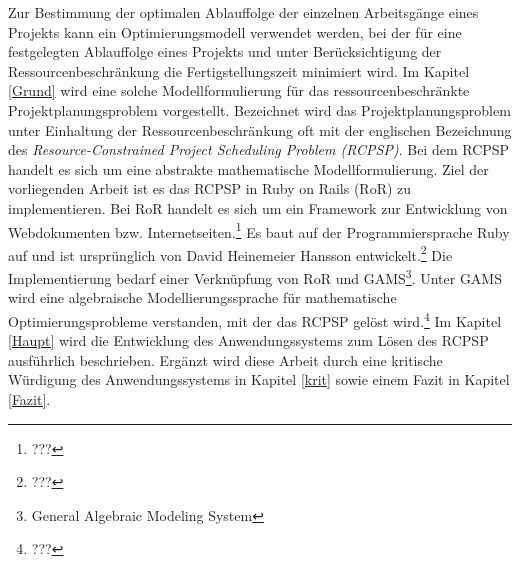 \documentclass[a4paper,12pt,parskip,bibtotoc,liststotoc]{article}
\begin{document}
Zur Bestimmung der optimalen Ablauffolge der einzelnen Arbeitsgänge eines Projekts kann ein Optimierungsmodell verwendet werden, bei der für eine festgelegten Ablauffolge eines Projekts und unter Berücksichtigung der Ressourcenbeschränkung die Fertigstellungszeit minimiert wird. Im Kapitel \ref{Grund} wird eine solche Modellformulierung für das ressourcenbeschränkte Projektplanungsproblem vorgestellt. Bezeichnet wird das Projektplanungsproblem unter Einhaltung der Ressourcenbeschränkung oft mit der englischen Bezeichnung des \textit{Resource-Constrained Project Scheduling Problem (RCPSP)}. Bei dem RCPSP handelt es sich um eine abstrakte mathematische Modellformulierung. Ziel der vorliegenden Arbeit ist es das RCPSP in Ruby on Rails (RoR) zu implementieren. Bei RoR handelt es sich um ein Framework zur Entwicklung von Webdokumenten bzw. Internetseiten.\footnote{???} Es baut auf der Programmiersprache Ruby auf und ist ursprünglich von David Heinemeier Hansson entwickelt.\footnote{???} Die Implementierung bedarf einer Verknüpfung von RoR und GAMS\footnote{General Algebraic Modeling System}. Unter GAMS wird eine algebraische Modellierungssprache für mathematische Optimierungsprobleme verstanden, mit der das RCPSP gelöst wird.\footnote{???} Im Kapitel \ref{Haupt} wird die Entwicklung des Anwendungssystems zum Lösen des RCPSP ausführlich beschrieben. Ergänzt wird diese Arbeit durch eine kritische Würdigung des Anwendungssystems in Kapitel \ref{krit} sowie einem Fazit in Kapitel \ref{Fazit}.
\end{document}
